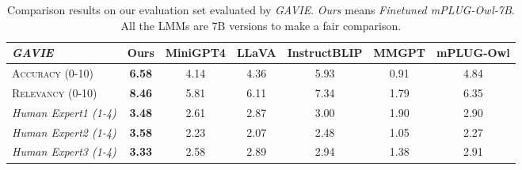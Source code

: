 \begin{table}[t]
\setlength\tabcolsep{3pt}
\centering
\small
\begin{tabular}{lcccccc}
\toprule[1.5pt]
\textit{GAVIE}& \textbf{Ours}&MiniGPT4 & LLaVA & InstructBLIP & MMGPT &mPLUG-Owl\\
\midrule
\textsc{Accuracy (0-10)} & \textbf{6.58}&4.14 & 4.36 & 5.93 & 0.91 & 4.84\\
\textsc{Relevancy (0-10)} & \textbf{8.46}&5.81 & 6.11 & 7.34 & 1.79& 6.35\\
\midrule
\textit{Human Expert1 (1-4)}& \textbf{3.48} & 2.61 & 2.87 & 3.00 & 1.90& 2.90\\
\textit{Human Expert2 (1-4)} &\textbf{3.58}& 2.23& 2.07& 2.48& 1.05& 2.27\\
\textit{Human Expert3 (1-4)} & \textbf{3.33} &2.58 & 2.89 & 2.94 & 1.38& 2.91\\
\bottomrule[1.5pt]
\end{tabular}
\vspace{-2mm}
\caption{
Comparison results on our evaluation set evaluated by \textit{GAVIE}. \textit{Ours} means \textit{Finetuned mPLUG-Owl-7B}. All the LMMs are 7B versions to make a fair comparison.
}
\label{tab:comparison_evaluation}
\end{table}









